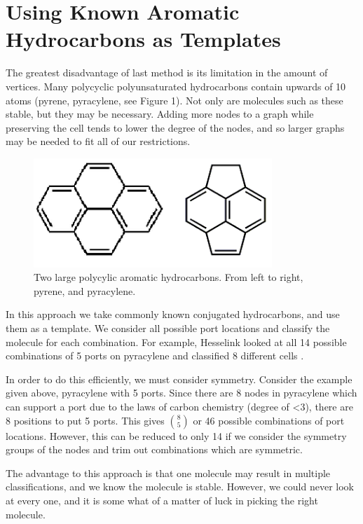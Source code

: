 \documentclass[12pt]{article}
\begin{document}
\section{Using Known Aromatic Hydrocarbons as Templates}

The greatest disadvantage of last method is its limitation in the amount of vertices. Many polycyclic polyunsaturated hydrocarbons contain upwards of 10 atoms (pyrene, pyracylene, see Figure 1). Not only are molecules such as these stable, but they may be necessary. Adding more nodes to a graph while preserving the cell tends to lower the degree of the nodes, and so larger graphs may be needed to fit all of our restrictions. 

\begin{figure}[ht!]
\centering
\includegraphics[width=90mm]{largeMolecules.png}
\caption{Two large polycylic aromatic hydrocarbons. From left to right, pyrene, and pyracylene.}
\end{figure}

In this approach we take commonly known conjugated hydrocarbons, and use them as a template. We consider all possible port locations and classify the molecule for each combination. For example, Hesselink \cite{H13} looked at all 14 possible combinations of 5 ports on pyracylene and classified 8 different cells \cite{H13}. 

In order to do this efficiently, we must consider symmetry. Consider the example given above, pyracylene with 5 ports. Since there are 8 nodes in pyracylene which can support a port due to the laws of carbon chemistry (degree of \textless 3), there are 8 positions to put 5 ports. This gives $\binom{8}{5}$ or 46 possible combinations of port locations. However, this can be reduced to only 14 if we consider the symmetry groups of the nodes and trim out combinations which are symmetric.

The advantage to this approach is that one molecule may result in multiple classifications, and we know the molecule is stable. However, we could never look at every one, and it is some what of a matter of luck in picking the right molecule.  
\end{document}
